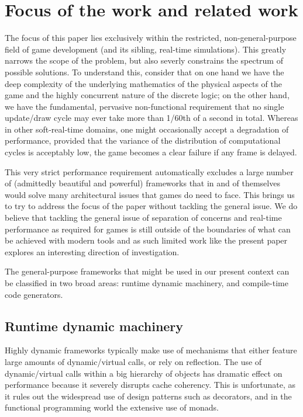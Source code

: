 \section{Focus of the work and related work}
\label{sec:focus}
The focus of this paper lies exclusively within the restricted, non-general-purpose field of game development (and its sibling, real-time simulations). This greatly narrows the scope of the problem, but also severly constrains the spectrum of possible solutions. To understand this, consider that on one hand we have the deep complexity of the underlying mathematics of the physical aspects of the game and the highly concurrent nature of the discrete logic; on the other hand, we have the fundamental, pervasive non-functional requirement that no single update/draw cycle may ever take more than 1/60th of a second in total. Whereas in other soft-real-time domains, one might occasionally accept a degradation of performance, provided that the variance of the distribution of computational cycles is acceptably low, the game becomes a clear failure if any frame is delayed.

This very strict performance requirement automatically excludes a large number of (admittedly beautiful and powerful) frameworks that in and of themselves would solve many architectural issues that games do need to face. This brings us to try to address the focus of the paper without tackling the general issue. We do believe that tackling the general issue of separation of concerns and real-time performance as required for games is still outside of the boundaries of what can be achieved with modern tools and as such limited work like the present paper explores an interesting direction of investigation.

The general-purpose frameworks that might be used in our present context can be classified in two broad areas: runtime dynamic machinery, and compile-time code generators.

\subsection{Runtime dynamic machinery}
Highly dynamic frameworks typically make use of mechanisms that either feature large amounts of dynamic/virtual calls, or rely on reflection. The use of dynamic/virtual calls within a big hierarchy of objects has dramatic effect on performance \cite{ungar1992object} because it severely disrupts cache coherency. This is unfortunate, as it rules out the widespread use of design patterns such as decorators, and in the functional programming world the extensive use of monads.

